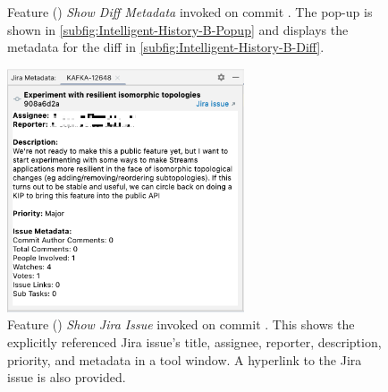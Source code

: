 \begin{figure}
    \centering
    \qquad
    \caption{
        Feature () \textit{Show Diff Metadata} invoked on commit . 
        The pop-up is shown in \autoref{subfig:Intelligent-History-B-Popup} 
        and displays the metadata for the diff in \autoref{subfig:Intelligent-History-B-Diff}.
    }
    \label{fig:Intelligent-History-B}%
\end{figure}

\begin{figure}
    \centering
    \includegraphics[width=7cm]{./images/intelligent-history-C.png}
    \caption{
        Feature () \textit{Show Jira Issue} invoked on commit .
        This shows the explicitly referenced Jira issue's title, assignee, reporter, description, priority, 
        and metadata in a tool window. A hyperlink to the Jira issue is also provided.
    }
    \label{fig:Intelligent-History-C}
\end{figure}

